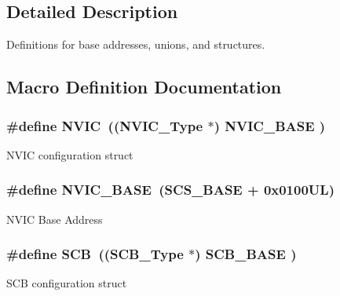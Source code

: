 \subsection{Detailed Description}
Definitions for base addresses, unions, and structures. 



\subsection{Macro Definition Documentation}
\hypertarget{group___c_m_s_i_s__core__base_gac8e97e8ce56ae9f57da1363a937f8a17}{}
\subsubsection[{N\+V\+I\+C}]{\setlength{\rightskip}{0pt plus 5cm}\#define N\+V\+I\+C~(({\bf N\+V\+I\+C\+\_\+\+Type}      $\ast$)     {\bf N\+V\+I\+C\+\_\+\+B\+A\+S\+E}     )}\label{group___c_m_s_i_s__core__base_gac8e97e8ce56ae9f57da1363a937f8a17}
N\+V\+I\+C configuration struct \hypertarget{group___c_m_s_i_s__core__base_gaa0288691785a5f868238e0468b39523d}{}
\subsubsection[{N\+V\+I\+C\+\_\+\+B\+A\+S\+E}]{\setlength{\rightskip}{0pt plus 5cm}\#define N\+V\+I\+C\+\_\+\+B\+A\+S\+E~({\bf S\+C\+S\+\_\+\+B\+A\+S\+E} +  0x0100\+U\+L)}\label{group___c_m_s_i_s__core__base_gaa0288691785a5f868238e0468b39523d}
N\+V\+I\+C Base Address \hypertarget{group___c_m_s_i_s__core__base_gaaaf6477c2bde2f00f99e3c2fd1060b01}{}
\subsubsection[{S\+C\+B}]{\setlength{\rightskip}{0pt plus 5cm}\#define S\+C\+B~(({\bf S\+C\+B\+\_\+\+Type}       $\ast$)     {\bf S\+C\+B\+\_\+\+B\+A\+S\+E}      )}\label{group___c_m_s_i_s__core__base_gaaaf6477c2bde2f00f99e3c2fd1060b01}
S\+C\+B configuration struct \hypertarget{group___c_m_s_i_s__core__base_gad55a7ddb8d4b2398b0c1cfec76c0d9fd}{}
